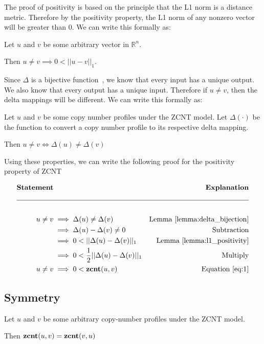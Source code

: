 
The proof of positivity is based on the principle that the L1 norm is a distance metric. Therefore by the positivity property, the L1 norm of any nonzero vector will be greater than $0$. We can write this formally as:
\begin{lemma}\label{lemma:l1_positivity}
    Let $u$ and $v$ be some arbitrary vector in $\mathbb{R}^n$. 
    
    Then $u \neq v \implies 0 < ||u - v||_1$.
\end{lemma}

Since $\Delta$ is a bijective function~\cite{zcnt_paper}, we know that every input has a unique output. We also know that every output has a unique input. Therefore if $u \neq v$, then the delta mappings will be different. We can write this formally as: 

\begin{lemma}\label{lemma:delta_bijection}
    Let $u$ and $v$ be some copy number profiles under the ZCNT model. Let $\Delta(\cdot)$ be the function to convert a copy number profile to its respective delta mapping. 
    
    Then $u \neq v \iff \Delta(u) \neq \Delta(v)$
\end{lemma}

Using these properties, we can write the following proof for the positivity property of ZCNT

\begin{align*}
    \textbf{Statement} & & \textbf{Explanation} \\
    \cline{1-3} \\
    u \neq v &\implies \Delta(u) \neq \Delta(v) & \text{Lemma}~\ref{lemma:delta_bijection} \\ 
    & \implies \Delta(u) - \Delta(v) \neq 0 & \text{Subtraction}\\
    & \implies 0 < ||\Delta(u) - \Delta(v)||_1 & \text{Lemma}~\ref{lemma:l1_positivity} \\
    & \implies 0 < \frac{1}{2}||\Delta(u) - \Delta(v)||_1 & \text{Multiply} \\
    u \neq v & \implies 0 < \zcnt (u, v) & \text{Equation}~\ref{eq:1}
\end{align*}

\subsection{Symmetry}
\begin{theorem}
    Let $u$ and $v$ be some arbitrary copy-number profiles under the ZCNT model. 
    
    Then $\textbf{zcnt} (u, v) = \textbf{zcnt} (v, u)$
\end{theorem}


